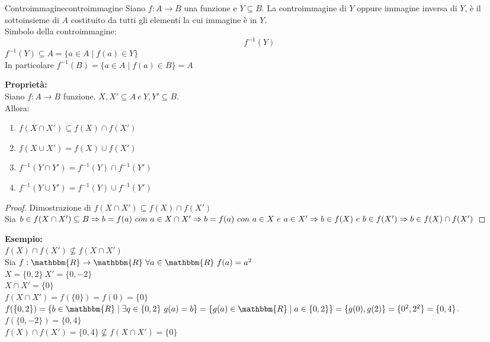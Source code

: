 \documentclass[12pt, letterpaper]{report}
\newcounter{definition}
\newcommand{\nmu}{}
\begin{document}
	\begin{definition}{\nmu Controimmagine}{controimmagine}
		Siano $f: A \to B$ una funzione e $Y \subseteq B$. La controimmagine di $Y$ oppure immagine inversa di $Y$, è il sottoinsieme di $A$ costituito da tutti gli elementi la cui immagine è in $Y$.
		\\
		Simbolo della controimmagine:
		\[
		f^{-1}(Y)
		\]
		$f^{-1}(Y) \subseteq A = \{a \in A \mid f(a) \in Y\}$
		\\
		In particolare $f^{-1}(B) = \{a \in A \mid f(a) \in B\} = A$
	\end{definition}
	\textbf{Proprietà: }
	\\
	Siano $f: A \to B$ funzione. $X, X' \subseteq A \ e \ Y, Y' \subseteq B$.
	\\
	Allora:
	\begin{enumerate}
		\item $f(X \cap X') \subseteq f(X) \cap f(X')$
		\item $f(X \cup X') = f(X) \cup f(X')$
		\item $f^{-1}(Y \cap Y') = f^{-1}(Y) \cap f^{-1}(Y')$
		\item $f^{-1}(Y \cup Y') = f^{-1}(Y) \cup f^{-1}(Y')$
	\end{enumerate}
	\begin{proof}{Dimostrazione di $f(X \cap X') \subseteq f(X) \cap f(X')$} \quad \\
		Sia $b \in f(X \cap X') \subseteq B \\ \Rightarrow b = f(a) \ con \ a \in X \cap X' \\ \Rightarrow b = f(a) \ con \ a \in X \ e \ a \in X' \\ \Rightarrow b \in f(X) \ e \ b \in f(X') \\ \Rightarrow b \in f(X) \cap f(X')$
	\end{proof}
	\textbf{Esempio: }
	\\
	$f(X) \cap f(X') \not \subseteq f(X \cap X')$
	\\
	Sia $f: \mathbbm{R} \to \mathbbm{R} \ \forall a \in \mathbbm{R} \ f(a) = a^2$
	\\
	$X = \{0, 2\} \ X' = \{0, -2\}$
	\\
	$X \cap X' = \{0\}$
	\\
	$f(X \cap X') = f(\{0\}) = f(0) = \{0\}$
	\\
	$f(\{0, 2\}) = \{b \in \mathbbm{R} \mid \exists q \in \{0, 2\} \ g(a) = b\} = \{g(a) \in \mathbbm{R} \mid a \in \{0,2\}\} = \{g(0), g(2)\} = \{0^2, 2^2\} = \{0, 4\}$.
	\\
	$f(\{0, -2\}) = \{0, 4\}$
	\\
	$f(X) \cap f(X') = \{0, 4\} \not \subseteq f(X \cap X') = \{0\}$
\end{document}
